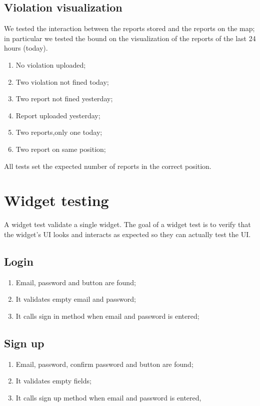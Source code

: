 \documentclass[../ITD.tex]{subfiles}
\begin{document}
    \subsection{Violation visualization}\label{subsec:violation-visualization}
    We tested the interaction between the reports stored and the reports on the map; in particular we tested the bound on the visualization of the reports of the last 24 hours (today).
    \begin{enumerate}
        \item No violation uploaded;
        \item Two violation not fined today;
        \item Two report not fined yesterday;
        \item Report uploaded yesterday;
        \item Two reports,only one today;
        \item Two report on same position;
    \end{enumerate}
    All tests set the expected number of reports in the correct position.
    \section{Widget testing}\label{sec:widget-testing}
    A widget test validate a single widget.
    The goal of a widget test is to verify that the widget’s UI looks and interacts as expected so they can actually test the UI.
    \subsection{Login}\label{subsec:login}
    \begin{enumerate}
        \item Email, password and button are found;
        \item It validates empty email and password;
        \item It calls sign in method when email and password is entered;
    \end{enumerate}
    \subsection{Sign up}\label{subsec:sign-up}
    \begin{enumerate}
        \item Email, password, confirm password and button are found;
        \item It validates empty fields;
        \item It calls sign up method when email and password is entered,
    \end{enumerate}
\end{document}
